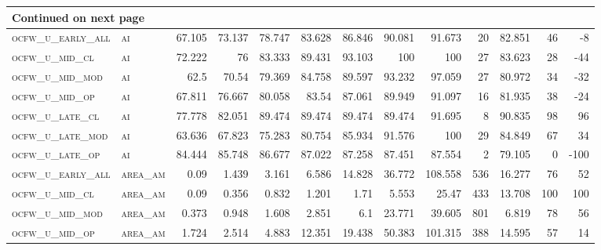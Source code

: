 \begin{landscape}
\begin{center}
\begin{footnotesize}
\begin{longtable}{llrrrrrrrr|rrr}
\hline \multicolumn{13}{|l|}{{Continued on next page}} \\ \hline
\endfoot

\hline \hline
\endlastfoot


\textsc{ocfw\_u\_early\_all} & \textsc{ai        }   & 67.105   & 73.137   & 78.747   & 83.628   & 86.846   & 90.081   & 91.673    & 20     & 82.851        & 46            & -8              \\
\textsc{ocfw\_u\_mid\_cl   } & \textsc{ai        }   & 72.222   & 76       & 83.333   & 89.431   & 93.103   & 100      & 100       & 27     & 83.623        & 28            & -44             \\
\textsc{ocfw\_u\_mid\_mod  } & \textsc{ai        }   & 62.5     & 70.54    & 79.369   & 84.758   & 89.597   & 93.232   & 97.059    & 27     & 80.972        & 34            & -32             \\
\textsc{ocfw\_u\_mid\_op   } & \textsc{ai        }   & 67.811   & 76.667   & 80.058   & 83.54    & 87.061   & 89.949   & 91.097    & 16     & 81.935        & 38            & -24             \\
\textsc{ocfw\_u\_late\_cl  } & \textsc{ai        }   & 77.778   & 82.051   & 89.474   & 89.474   & 89.474   & 89.474   & 91.695    & 8      & 90.835        & 98            & 96              \\
\textsc{ocfw\_u\_late\_mod } & \textsc{ai        }   & 63.636   & 67.823   & 75.283   & 80.754   & 85.934   & 91.576   & 100       & 29     & 84.849        & 67            & 34              \\
\textsc{ocfw\_u\_late\_op  } & \textsc{ai        }   & 84.444   & 85.748   & 86.677   & 87.022   & 87.258   & 87.451   & 87.554    & 2      & 79.105        & 0             & -100            \\
\textsc{ocfw\_u\_early\_all} & \textsc{area\_am  }   & 0.09     & 1.439    & 3.161    & 6.586    & 14.828   & 36.772   & 108.558   & 536    & 16.277        & 76            & 52              \\
\textsc{ocfw\_u\_mid\_cl   } & \textsc{area\_am  }   & 0.09     & 0.356    & 0.832    & 1.201    & 1.71     & 5.553    & 25.47     & 433    & 13.708        & 100           & 100             \\
\textsc{ocfw\_u\_mid\_mod  } & \textsc{area\_am  }   & 0.373    & 0.948    & 1.608    & 2.851    & 6.1      & 23.771   & 39.605    & 801    & 6.819         & 78            & 56              \\
\textsc{ocfw\_u\_mid\_op   } & \textsc{area\_am  }   & 1.724    & 2.514    & 4.883    & 12.351   & 19.438   & 50.383   & 101.315   & 388    & 14.595        & 57            & 14              \\

\end{longtable}
\end{footnotesize}
\end{center}
\end{landscape}
